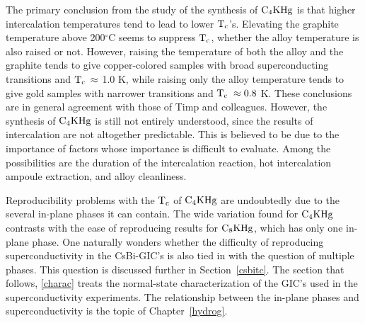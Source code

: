         The  primary conclusion  from  the  study of the synthesis  of $\rm
C_4KHg$ is that higher  intercalation  temperatures  tend to lead  to lower
$\rm T_c$'s.  Elevating the graphite temperature above 200$^{\circ}$C seems
to suppress $\rm T_c$, whether the alloy temperature is also raised or not.
However, raising the temperature of both the alloy  and  the graphite tends
to give  copper-colored samples with broad  superconducting transitions and
$\rm T_c \: \approx$ 1.0 K, while  raising only the alloy temperature tends
to give gold samples with narrower transitions and $\rm T_c \; \approx 0.8$
K.   These conclusions are  in  general agreement   with those of  Timp and
colleagues.\cite{J140,timp83} However,  the  synthesis of  $\rm  C_4KHg$ is
still not  entirely understood, since the  results of intercalation are not
altogether  predictable.  This is believed to  be due  to the importance of
factors whose importance is difficult to evaluate.  Among the possibilities
are the duration of  the intercalation reaction, hot  intercalation ampoule
extraction, and alloy cleanliness.

        Reproducibility problems with  the $\rm T_c$  of $\rm  C_4KHg$  are
undoubtedly due to the  several in-plane phases  it can contain.  The  wide
variation found  for $\rm C_4KHg$  contrasts with  the ease  of reproducing
results for $\rm C_8KHg$, which has only one in-plane phase.  One naturally
wonders  whether  the difficulty  of  reproducing superconductivity  in the
CsBi-GIC's is also  tied in  with the  question of multiple  phases.   This
question  is  discussed further  in Section~\ref{csbitc}.  The section that
follows, \ref{charac} treats the normal-state characterization  of the GIC's  used in the
superconductivity experiments.   The  relationship  between   the  in-plane
phases and superconductivity is the topic of Chapter~\ref{hydrog}.
